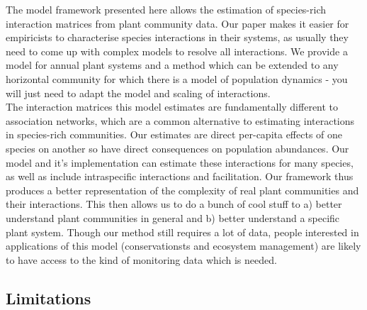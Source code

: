 \documentclass[a4,12pt]{article}
\begin{document}
    
    The model framework presented here allows the estimation of species-rich interaction matrices from plant community data. Our paper makes it easier for empiricists to characterise species interactions in their systems, as usually they need to come up with complex models to resolve all interactions. We provide a model for annual plant systems and a method which can be extended to any horizontal community for which there is a model of population dynamics - you will just need to adapt the model and scaling of interactions.\\

    The interaction matrices this model estimates are fundamentally different to association networks, which are a common alternative to estimating interactions in species-rich communities. Our estimates are direct per-capita effects of one species on another so have direct consequences on population abundances. Our model and it's implementation can estimate these interactions for many species, as well as include intraspecific interactions and facilitation. Our framework thus produces a better representation of the complexity of real plant communities and their interactions. This then allows us to do a bunch of cool stuff to a) better understand plant communities in general and b) better understand a specific plant system. Though our method still requires a lot of data, people interested in applications of this model (conservationsts and ecosystem management) are likely to have access to the kind of monitoring data which is needed. 




    \subsection{Limitations}
        
\end{document}
